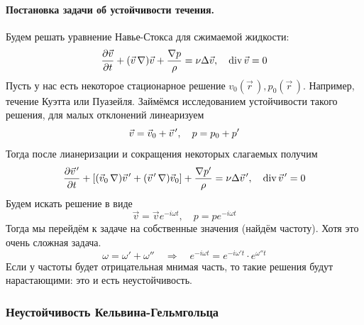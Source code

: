 \paragraph{Постановка задачи об устойчивости течения.} Будем решать 
уравнение Навье-Стокса для сжимаемой жидкости:
\begin{equation}
    \pdv{\vec{v}}{t}+ (\vec{v}\,\nabla) \vec{v} + \frac{\nabla p}{\rho}=
    \nu \Delta \vec{v}, \quad \operatorname{div} \vec{v} = 0
\end{equation}
Пусть у нас есть некоторое стационарное решение 
$v_0(\vec{r}\,), p_0(\vec{r}\,)$.
Например, течение Куэтта или Пуазейля. Займёмся исследованием
устойчивости такого решения, для малых отклонений линеаризуем
\begin{equation}
    \vec{v}=\vec{v}_0+\pvec{v}', \quad p = p_0 +p'
\end{equation}
Тогда после лианеризации и сокращения некоторых слагаемых получим
\begin{equation}
    \pdv{\pvec{v}'}{t}+\qty[(\vec{v}_0\,\nabla) \pvec{v}'+
        (\pvec{v}'\,\nabla)\vec{v}_0] + \frac{\nabla p'}{\rho}=
    \nu \Delta \pvec{v}', \quad \Div \pvec{v}' = 0
\end{equation}
Будем искать решение в виде
\begin{equation}
    \vec{v} = \vec{v}e^{-i\omega t}, \quad
    p = p e^{-i\omega t}
\end{equation}
Тогда мы перейдём к задаче на собственные значения (найдём частоту).
Хотя это очень сложная задача.
\begin{equation}
    \omega = \omega'+\omega''
    \quad\Rightarrow\quad 
    e^{-i\omega t} = e^{-i\omega' t}\cdot e^{\omega'' t} 
\end{equation}
Если у частоты
будет отрицательная мнимая часть, то такие решения будут нарастающими:
это и есть неустойчивость.

\subsubsection{Неустойчивость Кельвина\hspace{0.5pt}-Гельмгольца}

